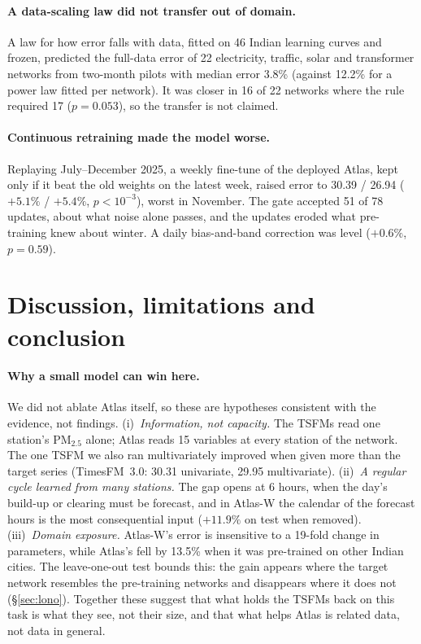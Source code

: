 \documentclass{article}
\newcommand{\pmtf}{PM$_{2.5}$}
\begin{document}
\paragraph{A data-scaling law did not transfer out of domain.} A law for how error falls with data, fitted on 46
Indian learning curves and frozen, predicted the full-data error of 22 electricity, traffic, solar and transformer
networks from two-month pilots with median error 3.8\% (against 12.2\% for a power law fitted per network). It was
closer in 16 of 22 networks where the rule required 17 ($p{=}0.053$), so the transfer is not claimed.

\paragraph{Continuous retraining made the model worse.} Replaying July--December 2025, a weekly fine-tune of the
deployed Atlas, kept only if it beat the old weights on the latest week, raised error to 30.39 / 26.94 ($+5.1\%$ /
$+5.4\%$, $p<10^{-3}$), worst in November. The gate accepted 51 of 78 updates, about what noise alone passes, and the
updates eroded what pre-training knew about winter. A daily bias-and-band correction was level ($+0.6\%$, $p{=}0.59$).

\section{Discussion, limitations and conclusion}
\label{sec:conclusion}

\paragraph{Why a small model can win here.} We did not ablate Atlas itself, so these are hypotheses consistent with
the evidence, not findings. (i)~\emph{Information, not capacity.} The TSFMs read one station's \pmtf{} alone; Atlas
reads 15 variables at every station of the network. The one TSFM we also ran multivariately improved when given more
than the target series (TimesFM~3.0: 30.31 univariate, 29.95 multivariate). (ii)~\emph{A regular cycle learned from
many stations.} The gap opens at 6 hours, when the day's build-up or clearing must be forecast, and in Atlas-W the
calendar of the forecast hours is the most consequential input ($+11.9\%$ on test when removed). (iii)~\emph{Domain
exposure.} Atlas-W's error is insensitive to a 19-fold change in parameters, while Atlas's fell by 13.5\% when it was
pre-trained on other Indian cities. The leave-one-out test bounds this: the gain appears where the target network resembles
the pre-training networks and disappears where it does not (\S\ref{sec:lono}). Together these suggest that what holds
the TSFMs back on this task is what they see, not their size, and that what helps Atlas is related data, not data in
general.
\end{document}
